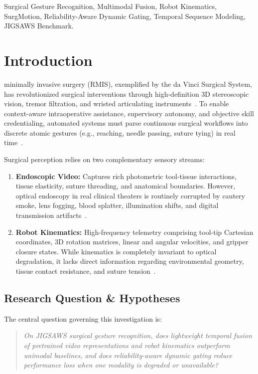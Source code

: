 \documentclass[10pt,journal]{IEEEtran}
\begin{document}
\begin{IEEEkeywords}
Surgical Gesture Recognition, Multimodal Fusion, Robot Kinematics, SurgMotion, Reliability-Aware Dynamic Gating, Temporal Sequence Modeling, JIGSAWS Benchmark.
\end{IEEEkeywords}

\section{Introduction}
 minimally invasive surgery (RMIS), exemplified by the da Vinci Surgical System, has revolutionized surgical interventions through high-definition 3D stereoscopic vision, tremor filtration, and wristed articulating instruments~\cite{gao2014jigsaws, maierhein2022surgical}. To enable context-aware intraoperative assistance, supervisory autonomy, and objective skill credentialing, automated systems must parse continuous surgical workflows into discrete atomic gestures (e.g., reaching, needle passing, suture tying) in real time~\cite{ahmidi2017dataset, dipietro2016recognizing}.

Surgical perception relies on two complementary sensory streams:
\begin{enumerate}
    \item \textbf{Endoscopic Video:} Captures rich photometric tool-tissue interactions, tissue elasticity, suture threading, and anatomical boundaries. However, optical endoscopy in real clinical theaters is routinely corrupted by cautery smoke, lens fogging, blood splatter, illumination shifts, and digital transmission artifacts~\cite{rashid2025robustendoclip}.
    \item \textbf{Robot Kinematics:} High-frequency telemetry comprising tool-tip Cartesian coordinates, 3D rotation matrices, linear and angular velocities, and gripper closure states. While kinematics is completely invariant to optical degradation, it lacks direct information regarding environmental geometry, tissue contact resistance, and suture tension~\cite{bai2025grad, zhou2026surgsync, vanamsterdam2021gesture}.
\end{enumerate}

\subsection{Research Question \& Hypotheses}
The central question governing this investigation is:
\begin{quote}
\textit{On JIGSAWS surgical gesture recognition, does lightweight temporal fusion of pretrained video representations and robot kinematics outperform unimodal baselines, and does reliability-aware dynamic gating reduce performance loss when one modality is degraded or unavailable?}
\end{quote}
\end{document}
